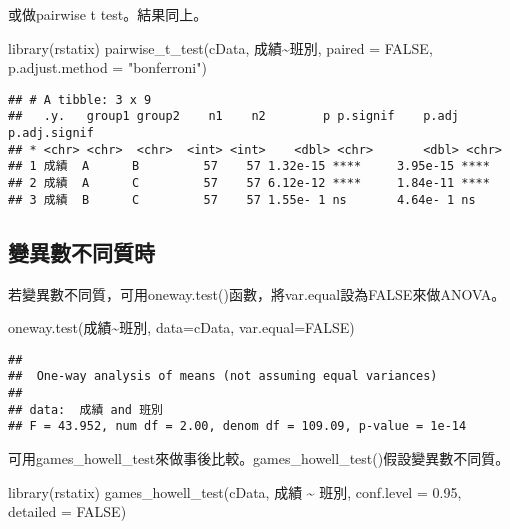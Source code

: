 \documentclass[
]{book}
\newenvironment{Shaded}{\begin{snugshade}}{\end{snugshade}}
\newcommand{\AttributeTok}[1]{\textcolor[rgb]{0.77,0.63,0.00}{#1}}
\newcommand{\ConstantTok}[1]{\textcolor[rgb]{0.00,0.00,0.00}{#1}}
\newcommand{\FloatTok}[1]{\textcolor[rgb]{0.00,0.00,0.81}{#1}}
\newcommand{\FunctionTok}[1]{\textcolor[rgb]{0.00,0.00,0.00}{#1}}
\newcommand{\NormalTok}[1]{#1}
\newcommand{\SpecialCharTok}[1]{\textcolor[rgb]{0.00,0.00,0.00}{#1}}
\newcommand{\StringTok}[1]{\textcolor[rgb]{0.31,0.60,0.02}{#1}}
\begin{document}
或做pairwise t test。結果同上。

\begin{Shaded}
\begin{Highlighting}[]
\FunctionTok{library}\NormalTok{(rstatix)}
\FunctionTok{pairwise\_t\_test}\NormalTok{(cData, 成績}\SpecialCharTok{\textasciitilde{}}\NormalTok{班別, }\AttributeTok{paired =} \ConstantTok{FALSE}\NormalTok{, }\AttributeTok{p.adjust.method =} \StringTok{"bonferroni"}\NormalTok{)}
\end{Highlighting}
\end{Shaded}

\begin{verbatim}
## # A tibble: 3 x 9
##   .y.   group1 group2    n1    n2        p p.signif    p.adj p.adj.signif
## * <chr> <chr>  <chr>  <int> <int>    <dbl> <chr>       <dbl> <chr>       
## 1 成績  A      B         57    57 1.32e-15 ****     3.95e-15 ****        
## 2 成績  A      C         57    57 6.12e-12 ****     1.84e-11 ****        
## 3 成績  B      C         57    57 1.55e- 1 ns       4.64e- 1 ns
\end{verbatim}

\hypertarget{ux8b8aux7570ux6578ux4e0dux540cux8ceaux6642}{%
\subsection{變異數不同質時}\label{ux8b8aux7570ux6578ux4e0dux540cux8ceaux6642}}

若變異數不同質，可用oneway.test()函數，將var.equal設為FALSE來做ANOVA。

\begin{Shaded}
\begin{Highlighting}[]
\FunctionTok{oneway.test}\NormalTok{(成績}\SpecialCharTok{\textasciitilde{}}\NormalTok{班別, }\AttributeTok{data=}\NormalTok{cData, }\AttributeTok{var.equal=}\ConstantTok{FALSE}\NormalTok{)}
\end{Highlighting}
\end{Shaded}

\begin{verbatim}
## 
##  One-way analysis of means (not assuming equal variances)
## 
## data:  成績 and 班別
## F = 43.952, num df = 2.00, denom df = 109.09, p-value = 1e-14
\end{verbatim}

可用games\_howell\_test來做事後比較。games\_howell\_test()假設變異數不同質。

\begin{Shaded}
\begin{Highlighting}[]
\FunctionTok{library}\NormalTok{(rstatix)}
\FunctionTok{games\_howell\_test}\NormalTok{(cData, 成績 }\SpecialCharTok{\textasciitilde{}}\NormalTok{ 班別, }\AttributeTok{conf.level =} \FloatTok{0.95}\NormalTok{, }\AttributeTok{detailed =} \ConstantTok{FALSE}\NormalTok{)}
\end{Highlighting}
\end{Shaded}
\end{document}
